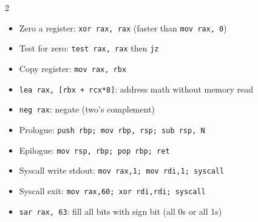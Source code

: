 \documentclass[11pt, letterpaper]{article}
\begin{document}
\begin{tcolorbox}[colback=part6bg, colframe=sectionred,
  title={\bfseries Common x86-64 Idioms}, arc=3pt, boxrule=1pt]
\footnotesize
\begin{multicols}{2}
\begin{itemize}[noitemsep, leftmargin=*]
  \item Zero a register: \texttt{xor rax, rax} (faster than \texttt{mov rax, 0})
  \item Test for zero: \texttt{test rax, rax} then \texttt{jz}
  \item Copy register: \texttt{mov rax, rbx}
  \item \texttt{lea rax, [rbx + rcx*8]}: address math without memory read
  \item \texttt{neg rax}: negate (two's complement)
\end{itemize}
\columnbreak
\begin{itemize}[noitemsep, leftmargin=*]
  \item Prologue: \texttt{push rbp; mov rbp, rsp; sub rsp, N}
  \item Epilogue: \texttt{mov rsp, rbp; pop rbp; ret}
  \item Syscall write stdout: \texttt{mov rax,1; mov rdi,1; syscall}
  \item Syscall exit: \texttt{mov rax,60; xor rdi,rdi; syscall}
  \item \texttt{sar rax, 63}: fill all bits with sign bit (all 0s or all 1s)
\end{itemize}
\end{multicols}
\end{tcolorbox}
\end{document}
